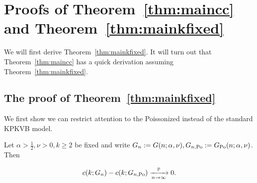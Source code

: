


\section{Proofs of Theorem~\ref{thm:maincc} and Theorem~\ref{thm:mainkfixed}\label{sec:proofs_fixed_k}}


We will first derive Theorem~\ref{thm:mainkfixed}. It will turn out that Theorem~\ref{thm:maincc} has a quick derivation
assuming Theorem~\ref{thm:mainkfixed}.



\subsection{The proof of Theorem~\ref{thm:mainkfixed}}



We first show we can restrict attention to the Poissonized instead of the standard KPKVB model.

\begin{lemma} Let $\alpha>\frac12,\nu>0, k\geq 2$ be fixed and write $G_n := G(n;\alpha,\nu), G_{n,\text{Po}} := G_{\text{Po}}(n;\alpha,\nu)$.
Then 

$$ c(k; G_n)-c(k; G_{n,\text{Po}}) \xrightarrow[n\to\infty]{\mathbb{P}} 0. $$
\end{lemma}

